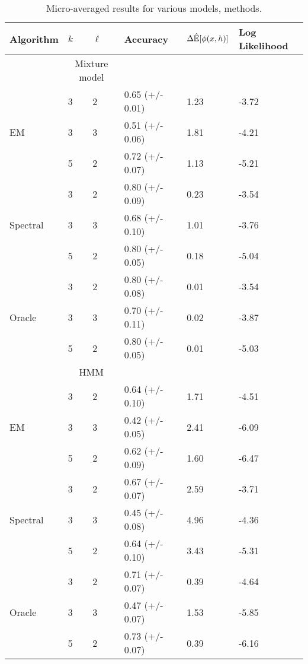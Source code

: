\begin{table}
\begin{center}
    \begin{tabular}{l | l l | l l l }
        Algorithm & $k$ & $\ell$ & Accuracy & $\Delta \hat {\mathbb{E}}[\phi(x,h)]$ & Log Likelihood \\ \hline
        & \multicolumn{2}{|c|}{Mixture model} & & & \\ \hline
        \multirow{3}{*}{EM} 
        & 3 & 2 & 0.65 (+/- 0.01) & 1.23 & -3.72 \\
        & 3 & 3 & 0.51 (+/- 0.06) & 1.81 & -4.21\\
        & 5 & 2 & 0.72 (+/- 0.07) & 1.13 & -5.21\\ \hline
        \multirow{3}{*}{Spectral} 
        & 3 & 2 & 0.80 (+/- 0.09) & 0.23 & -3.54 \\
        & 3 & 3 & 0.68 (+/- 0.10) & 1.01 & -3.76 \\
        & 5 & 2 & 0.80 (+/- 0.05) & 0.18 & -5.04 \\ \hline
        \multirow{3}{*}{Oracle} 
        & 3 & 2 & 0.80 (+/- 0.08) & 0.01& -3.54 \\
        & 3 & 3 & 0.70 (+/- 0.11) & 0.02& -3.87 \\
        & 5 & 2 & 0.80 (+/- 0.05) & 0.01& -5.03 \\ \hline
        & \multicolumn{2}{|c|}{HMM} & & & \\ \hline
        \multirow{3}{*}{EM} 
& 3 & 2 & 0.64 (+/- 0.10) & 1.71 & -4.51 \\  
& 3 & 3 & 0.42 (+/- 0.05) & 2.41 & -6.09 \\  
& 5 & 2 & 0.62 (+/- 0.09) & 1.60 & -6.47 \\  \hline
        \multirow{3}{*}{Spectral} 
& 3 & 2 & 0.67 (+/- 0.07) & 2.59 & -3.71 \\ 
& 3 & 3 & 0.45 (+/- 0.08) & 4.96 & -4.36 \\ 
& 5 & 2 & 0.64 (+/- 0.10) & 3.43 & -5.31 \\ \hline
        \multirow{3}{*}{Oracle} 
& 3 & 2 & 0.71 (+/- 0.07) & 0.39 & -4.64 \\ 
& 3 & 3 & 0.47 (+/- 0.07) & 1.53 & -5.85 \\ 
& 5 & 2 & 0.73 (+/- 0.07) & 0.39 & -6.16 \\ \hline
    \end{tabular}
    \caption{Micro-averaged results for various models, methods.}
    \label{tab:errorsa}
\end{center}
\end{table}
